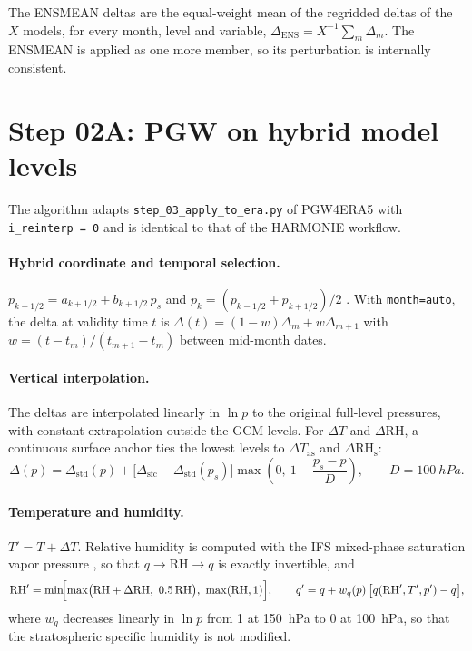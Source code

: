 \documentclass[11pt,a4paper]{article}
\newcommand{\code}[1]{\texttt{#1}}
\newcommand{\dT}{\Delta T}
\newcommand{\dRH}{\Delta \mathrm{RH}}
\begin{document}
The ENSMEAN deltas are the equal-weight mean of the regridded deltas of the
$X$ models, for every month, level and variable,
$\Delta_{\mathrm{ENS}} = X^{-1}\sum_m \Delta_m$. The ENSMEAN is applied as
one more member, so its perturbation is internally consistent.

\section{Step 02A: PGW on hybrid model levels}
\label{sec:step02}

The algorithm adapts \code{step\_03\_apply\_to\_era.py} of PGW4ERA5
\citep{Brogli2023} with \code{i\_reinterp = 0} and is identical to that of the
HARMONIE workflow.

\paragraph{Hybrid coordinate and temporal selection.}
$p_{k+1/2} = a_{k+1/2} + b_{k+1/2}\, p_s$ and
$p_k = (p_{k-1/2} + p_{k+1/2})/2$ \citep{ECMWF_IFS_III}. With
\code{month=auto}, the delta at validity time $t$ is
$\Delta(t) = (1-w)\Delta_m + w\Delta_{m+1}$ with
$w = (t-t_m)/(t_{m+1}-t_m)$ between mid-month dates.

\paragraph{Vertical interpolation.}
The deltas are interpolated linearly in $\ln p$ to the original full-level
pressures, with constant extrapolation outside the GCM levels. For $\dT$ and
$\dRH$, a continuous surface anchor ties the lowest levels to $\Delta
T_{\mathrm{as}}$ and $\Delta\mathrm{RH_s}$:
\begin{equation}
  \Delta(p) = \Delta_{\mathrm{std}}(p) + \bigl[\Delta_{\mathrm{sfc}} - \Delta_{\mathrm{std}}(p_s)\bigr]
  \max\!\left(0,\ 1 - \frac{p_s - p}{D}\right),\qquad D = \SI{100}{hPa}.
  \label{eq:anchor}
\end{equation}

\paragraph{Temperature and humidity.}
$T' = T + \dT$. Relative humidity is computed with the IFS mixed-phase
saturation vapor pressure \citep{ECMWF_IFS_IV}, so that $q \to
\mathrm{RH} \to q$ is exactly invertible, and
\begin{equation}
  \mathrm{RH}' = \min\!\Bigl[\max\bigl(\mathrm{RH} + \dRH,\ 0.5\,\mathrm{RH}\bigr),\ \max(\mathrm{RH}, 1)\Bigr],
  \qquad
  q' = q + w_q(p)\,\bigl[q(\mathrm{RH}', T', p') - q\bigr],
\end{equation}
where $w_q$ decreases linearly in $\ln p$ from 1 at \SI{150}{hPa} to 0 at
\SI{100}{hPa}, so that the stratospheric specific humidity is not modified.
\end{document}
